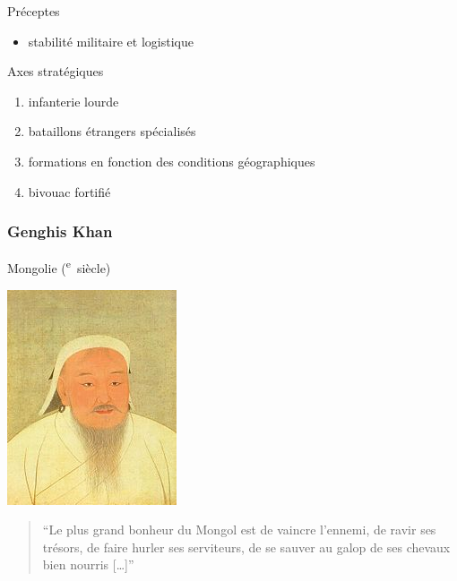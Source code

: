 \documentclass{article}
\newcommand{\cRM}[1]{\MakeUppercase{\romannumeral #1}}  %
\newcommand{\siecle}[1]{\cRM{#1}\textsuperscript{e}~siècle}
\begin{document}
Préceptes
\begin{itemize}
\item stabilité militaire et logistique
\end{itemize}
Axes stratégiques
\begin{enumerate}
\item infanterie lourde
\item bataillons étrangers spécialisés
\item formations en fonction des conditions géographiques
\item bivouac fortifié
\end{enumerate}
\cite{caesar_wiki, caesar_lacks}

\subsubsection{Genghis Khan}
Mongolie (\siecle{12})
\hfill \begin{minipage}{5cm}
\includegraphics[width=\linewidth]{../ressources/genghis_khan}
\end{minipage}
\begin{quote}“Le plus grand bonheur du Mongol est de vaincre l’ennemi, de ravir ses trésors, de faire hurler ses serviteurs, de se sauver au galop de ses chevaux bien nourris [\ldots]”\end{quote}
\end{document}
